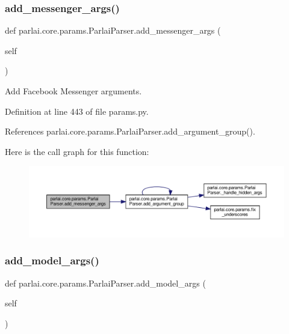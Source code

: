 \subsubsection{\texorpdfstring{add\+\_\+messenger\+\_\+args()}{add\_messenger\_args()}}
{\footnotesize\ttfamily def parlai.\+core.\+params.\+Parlai\+Parser.\+add\+\_\+messenger\+\_\+args (\begin{DoxyParamCaption}\item[{}]{self }\end{DoxyParamCaption})}

\begin{DoxyVerb}Add Facebook Messenger arguments.\end{DoxyVerb}
 

Definition at line 443 of file params.\+py.



References parlai.\+core.\+params.\+Parlai\+Parser.\+add\+\_\+argument\+\_\+group().

Here is the call graph for this function\+:
\nopagebreak
\begin{figure}[H]
\begin{center}
\leavevmode
\includegraphics[width=350pt]{classparlai_1_1core_1_1params_1_1ParlaiParser_aed38c7346112f11851969224cb25ad1e_cgraph}
\end{center}
\end{figure}
\mbox{\label{classparlai_1_1core_1_1params_1_1ParlaiParser_af05d40e27abb0740948fdccfde5b8808}} 
\subsubsection{\texorpdfstring{add\+\_\+model\+\_\+args()}{add\_model\_args()}}
{\footnotesize\ttfamily def parlai.\+core.\+params.\+Parlai\+Parser.\+add\+\_\+model\+\_\+args (\begin{DoxyParamCaption}\item[{}]{self }\end{DoxyParamCaption})}

